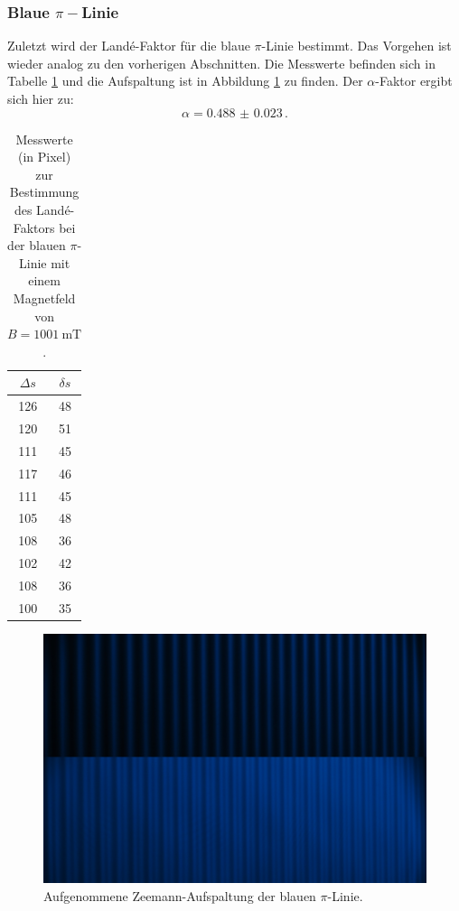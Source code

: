 \subsubsection{Blaue \texorpdfstring{$\pi-$}ALinie}
	Zuletzt wird der Landé-Faktor für die blaue $\pi$-Linie bestimmt. Das Vorgehen ist wieder
	analog zu den vorherigen Abschnitten.
	Die Messwerte befinden sich in Tabelle \ref{tab:blau_pi} und die Aufspaltung
	ist in Abbildung \ref{fig:blau_pi} zu finden.
	Der $\alpha$-Faktor ergibt sich hier zu:
	\begin{equation*}
		\alpha = \SI{0.488(23)} \, \text{.}
	\end{equation*}
	\begin{table}
		\centering
		\caption{Messwerte (in Pixel) zur Bestimmung des Landé-Faktors bei der blauen $\pi$-Linie mit einem Magnetfeld von $B = \SI{1001}{\milli\tesla}$.}
		\label{tab:blau_pi}
		\begin{tabular}{c | c}
			\toprule
			$\Delta s$ & $\delta s$\\
			\midrule
			126 & 48 \\
			120 & 51 \\
			111 & 45 \\
			117 & 46 \\
			111 & 45 \\
			105 & 48 \\
			108 & 36 \\
			102 & 42 \\
			108 & 36 \\
			100 & 35 \\
			\bottomrule
		\end{tabular}
	\end{table}
	\begin{figure}
	\centering
	\includegraphics[width=\textwidth]{ouurs/blau_pi_crop.png}
	\caption{Aufgenommene Zeemann-Aufspaltung der blauen $\pi$-Linie.}
	\label{fig:blau_pi}
\end{figure}

